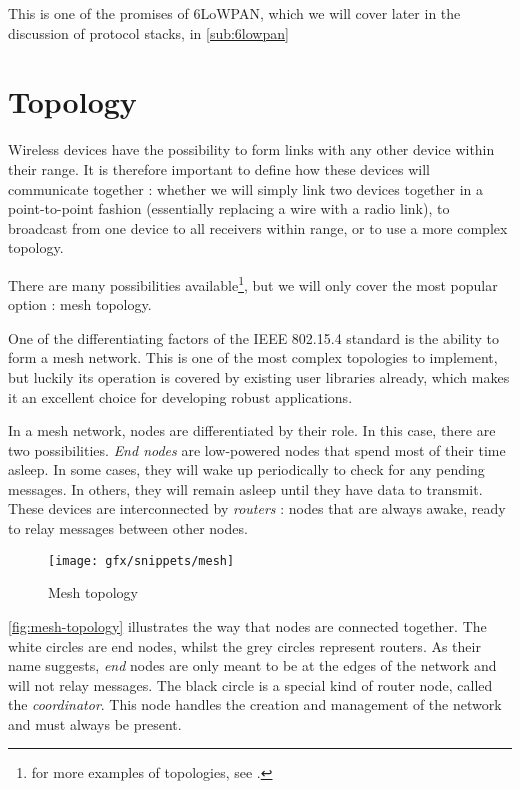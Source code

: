 This is one of the promises of 6LoWPAN, which we will cover later in the
discussion of protocol stacks, in \autoref{sub:6lowpan}



\section{Topology}\label{sec:topology}

Wireless devices have the possibility to form links with any other device within
their range. It is therefore important to define how these devices will
communicate together : whether we will simply link two devices together in
a point-to-point fashion (essentially replacing a wire with a radio link), to
broadcast from one device to all receivers within range, or to use a more
complex topology.

There are many possibilities available\footnote{for more examples of topologies,
see \citep[sec. 2.3.4]{hunn2010}.}, but we will only cover the most popular
option : mesh topology.

One of the differentiating factors of the IEEE 802.15.4 standard is the ability
to form a mesh network. This is one of the most complex topologies to implement,
but luckily its operation is covered by existing user libraries already, which
makes it an excellent choice for developing robust applications.

In a mesh network, nodes are differentiated by their role. In this case, there
are two possibilities. \emph{End nodes} are low-powered nodes that spend most of
their time asleep. In some cases, they will wake up periodically to check for
any pending messages. In others, they will remain asleep until they have data to
transmit. These devices are interconnected by \emph{routers} : nodes that are
always awake, ready to relay messages between other nodes.

\begin{figure}[htb]
  \begin{center}
    \texttt{[image: gfx/snippets/mesh]}
  \end{center}
  \caption{Mesh topology\citep{hunn2010}}
  \label{fig:mesh-topology}
\end{figure}

\autoref{fig:mesh-topology} illustrates the way that nodes are connected
together. The white circles are end nodes, whilst the grey circles represent
routers. As their name suggests, \emph{end} nodes are only meant to be at the
edges of the network and will not relay messages. The black circle is a special
kind of router node, called the \emph{coordinator}. This node handles the
creation and management of the network and must always be present.

